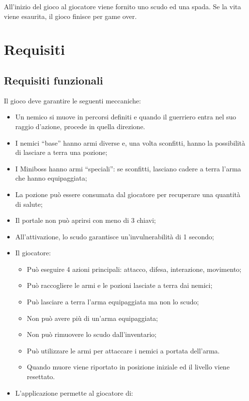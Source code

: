 \documentclass[a4paper, italian, 11pt, oneside]{report}
\begin{document}
All'inizio del gioco al giocatore viene fornito uno scudo ed una spada. Se la vita viene esaurita, il gioco finisce per game over.

\section{Requisiti}

\subsection{Requisiti funzionali}
Il gioco deve garantire le seguenti meccaniche:
\begin{itemize}
  \item Un nemico si muove in percorsi definiti e quando il guerriero entra nel suo raggio d'azione, procede in quella direzione. 
  \item I nemici ``base'' hanno armi diverse e, una volta sconfitti, hanno la possibilità di lasciare a terra una pozione;
  \item I Miniboss hanno armi ``speciali'': se sconfitti, lasciano cadere a terra l'arma che hanno equipaggiata;
  \item La pozione può essere consumata dal giocatore per recuperare una quantità di salute;
  \item Il portale non può aprirsi con meno di 3 chiavi;
  \item All'attivazione, lo scudo garantisce un'invulnerabilità di 1 secondo;
  \item Il giocatore:
  \begin{itemize}
    \item Può eseguire 4 azioni principali: attacco, difesa, interazione, movimento;
    \item Può raccogliere le armi e le pozioni lasciate a terra dai nemici;
    \item Può lasciare a terra l'arma equipaggiata ma non lo scudo;
    \item Non può avere più di un'arma equipaggiata;
    \item Non può rimuovere lo scudo dall'inventario;
    \item Può utilizzare le armi per attaccare i nemici a portata dell'arma.
    \item Quando muore viene riportato in posizione iniziale ed il livello viene resettato.
  \end{itemize}
  \item L'applicazione permette al giocatore di:

\end{itemize}
\end{document}
